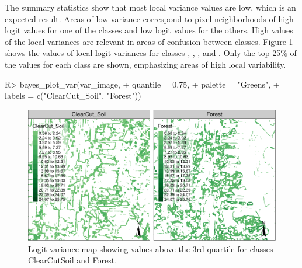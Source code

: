 \documentclass[
  shortnames]{jss}
\begin{document}
The summary statistics show that most local variance values are low, which is an expected result. Areas of low variance correspond to pixel neighborhoods of high logit values for one of the classes and low logit values for the others. High values of the local variances are relevant in areas of confusion between classes. Figure \ref{fig:vcube} shows the values of local logit variances for classes , , , and . Only the top 25\% of the values for each class are shown, emphasizing areas of high local variability.

\begin{CodeChunk}
\begin{CodeInput}
R> bayes_plot_var(var_image, 
+                  quantile = 0.75, 
+                  palette = "Greens",
+                  labels = c("ClearCut_Soil", "Forest"))
\end{CodeInput}
\begin{figure}[h]

{\centering \includegraphics{Bayesian_smoothing_JSS_files/figure-latex/vcube-1} 

}

\caption[Logit variance map showing values above the 3rd quartile for classes ClearCutSoil and Forest]{Logit variance map showing values above the 3rd quartile for classes ClearCutSoil and Forest.}\label{fig:vcube}
\end{figure}
\end{CodeChunk}
\end{document}
